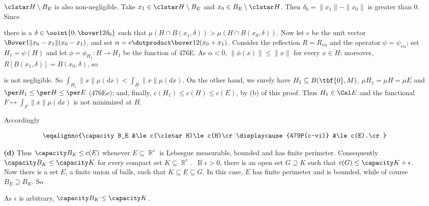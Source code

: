 {\noindent $\clstar H\setminus B_E$ is also non-negligible.
Take $x_1\in\clstar H\setminus B_E$ and $x_0\in B_E\setminus\clstar H$.
Then $\delta_0=\|x_1\|-\|x_0\|$ is greater than $0$.
Since


\noindent there is a $\delta\in\ooint{0,\bover12\delta_0}$ such that
$\mu(H\cap B(x_1,\delta))>\mu(H\cap B(x_0,\delta))$.   Now let $e$ be the
unit vector $\Bover1{\|x_0-x_1\|}(x_0-x_1)$, and set
$\alpha=\varinnerprod{e}{\bover12(x_0+x_1)}$.   Consider the reflection
$R=R_{e\alpha}$ and the operator $\psi=\psi_{e\alpha}$;  set $H_1=\psi(H)$
and let $\phi=\phi_{H_1}:H\to H_1$ be the function of 476E.   As
$\alpha<0$, $\|\phi(x)\|\le\|x\|$ for every $x\in H$;   moreover,
$R[B(x_1,\delta)]=B(x_0,\delta)$, so


\noindent is not negligible.   So
$\int_{H_1}\|x\|\mu(dx)<\int_H\|x\|\mu(dx)$.   On the other hand, we
surely have $H_1\subseteq B(\tbf{0},M)$, $\mu H_1=\mu H=\mu E$ and
$\per H_1\le\per H\le\per E$ (476Ee);  and, finally,
$c(H_1)\le c(H)\le c(E)$, by (b) of this proof.   Thus $H_1\in\Cal E$ and
the functional $F\mapsto\int_F\|x\|\mu(dx)$ is not minimized at $H$.\
\Bang\Qed

\medskip

 Accordingly

$$\eqalignno{\capacity B_E
&\le c(\clstar H)\le c(H)\cr
\displaycause{479P(c-vi)}
&\le c(E).\cr}$$

\medskip

{\bf (d)} Thus $\capacity B_E\le c(E)$ whenever $E\subseteq\BbbR^r$ is
Lebesgue
measurable, bounded and has finite perimeter.   Consequently
$\capacity B_K\le\capacity K$ for every compact set $K\subseteq\BbbR^r$.
\Prf\ If $\epsilon>0$, there is an open set $G\supseteq K$ such that
$c(G)\le\capacity K+\epsilon$.   Now there is a set $E$, a finite union
of balls,
such that $K\subseteq E\subseteq G$.   In this case, $E$ has finite
perimeter and is bounded, while of course $B_E\supseteq B_K$.   So


\noindent As $\epsilon$ is arbitrary, $\capacity B_K\le\capacity K$.\ \Qed

}
